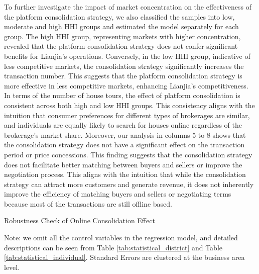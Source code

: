 \documentclass[11pt]{article}
\begin{document}

To further investigate the impact of market concentration on the effectiveness of the platform consolidation strategy, we also classified the samples into low, moderate and high HHI groups and estimated the model separately for each group. The high HHI group, representing markets with higher concentration, revealed that the platform consolidation strategy does not confer significant benefits for Lianjia's operations. Conversely, in the low HHI group, indicative of less competitive markets, the consolidation strategy significantly increases the transaction number. This suggests that the platform consolidation strategy is more effective in less competitive markets, enhancing Lianjia's competitiveness. In terms of the number of house tours, the effect of platform consolidation is consistent across both high and low HHI groups. This consistency aligns with the intuition that consumer preferences for different types of brokerages are similar, and individuals are equally likely to search for houses online regardless of the brokerage's market share. Moreover, our analysis in columns 5 to 8 shows that the consolidation strategy does not have a significant effect on the transaction period or price concessions. This finding suggests that the consolidation strategy does not facilitate better matching between buyers and sellers or improve the negotiation process. This aligns with the intuition that while the consolidation strategy can attract more customers and generate revenue, it does not inherently improve the efficiency of matching buyers and sellers or negotiating terms because most of the transactions are still offline based.

\begin{table}
  \begin{center}
    \begin{scriptsize}
      \caption{Robustness Check of Online Consolidation Effect}
      \label{tab:heter_platform_did_1}
      
    
    Note: we omit all the control variables in the regression model, and detailed descriptions can be seen from Table \ref{tab:statistical_district} and Table \ref{tab:statistical_individual}. Standard Errors are clustered at the business area level.
    \end{scriptsize}
  \end{center}
\end{table}
\end{document}
